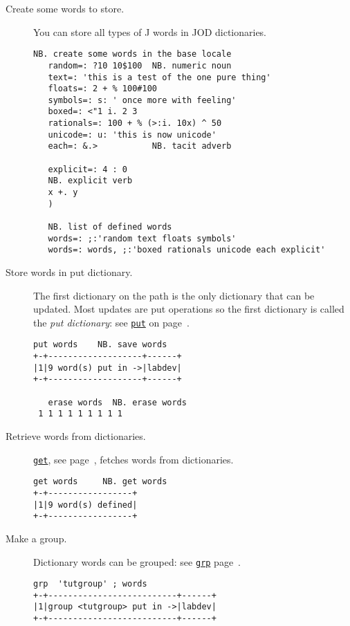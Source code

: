 \begin{description}
\item[Create some words to store.] You can store all types of J words
in JOD dictionaries.
\begin{lstlisting}[frame=single,framerule=0pt]
   NB. create some words in the base locale
   random=: ?10 10$100  NB. numeric noun
   text=: 'this is a test of the one pure thing'
   floats=: 2 + % 100#100
   symbols=: s: ' once more with feeling'
   boxed=: <"1 i. 2 3
   rationals=: 100 + % (>:i. 10x) ^ 50
   unicode=: u: 'this is now unicode'
   each=: &.>           NB. tacit adverb
   
   explicit=: 4 : 0
   NB. explicit verb
   x +. y
   )
   
   NB. list of defined words
   words=: ;:'random text floats symbols'
   words=: words, ;:'boxed rationals unicode each explicit'
\end{lstlisting}

\item[Store words in put dictionary.] The first dictionary on the path is the
only dictionary that can be updated.  Most updates are put
operations so the first dictionary is called the \emph{put dictionary}\label{xr:putdic}: see
\hyperlink{il:put}{\texttt{put}} on page~\pageref{ss:put}.
\begin{lstlisting}[frame=single,framerule=0pt]
   put words    NB. save words
+-+-------------------+------+
|1|9 word(s) put in ->|labdev|
+-+-------------------+------+

   erase words  NB. erase words
 1 1 1 1 1 1 1 1 1
\end{lstlisting}

\item[Retrieve words from dictionaries.] \hyperlink{il:get}{\texttt{get}}, see 
page~\pageref{ss:get}, fetches words from dictionaries.  
\begin{lstlisting}[frame=single,framerule=0pt]
   get words     NB. get words
+-+-----------------+
|1|9 word(s) defined|
+-+-----------------+
\end{lstlisting}

\item[Make a group.] Dictionary words can be grouped: see \hyperlink{il:grp}{\texttt{grp}} 
page~\pageref{ss:grp}.  
\begin{lstlisting}[frame=single,framerule=0pt]
   grp  'tutgroup' ; words
+-+--------------------------+------+
|1|group <tutgroup> put in ->|labdev|
+-+--------------------------+------+
\end{lstlisting}


\end{description}
